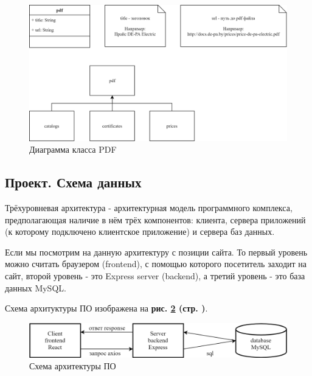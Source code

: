 \begin{figure}[!hb]
    \centering
    \includegraphics[width=12cm]
        {_assets/gpi_a_pdf.png}
    \caption{Диаграмма класса PDF}
    \label{fig:gpi_pz_pdf}
\end{figure}

\subsection{Проект. Схема данных}

Трёхуровневая архитектура - архитектурная модель программного комплекса,
предполагающая наличие в нём трёх компонентов: клиента, сервера приложений
(к которому подключено клиентское приложение) и сервера баз данных.

Если мы посмотрим на данную архитектуру с позиции сайта.
То первый уровень можно считать браузером (frontend), с помощью которого посетитель заходит на сайт,
второй уровень - это Express server (backend), а третий уровень - это база данных MySQL.

Схема архитуктуры ПО изображена на
\textbf{рис. \ref{fig:gpi_client_server} (стр. \pageref{fig:gpi_client_server})}.

\begin{figure}[!hp]
    \centering
    \includegraphics[width=16cm]
        {_assets/gpi_client_server.png}
    \caption{Схема архитектуры ПО}
    \label{fig:gpi_client_server}
\end{figure}

\newpage